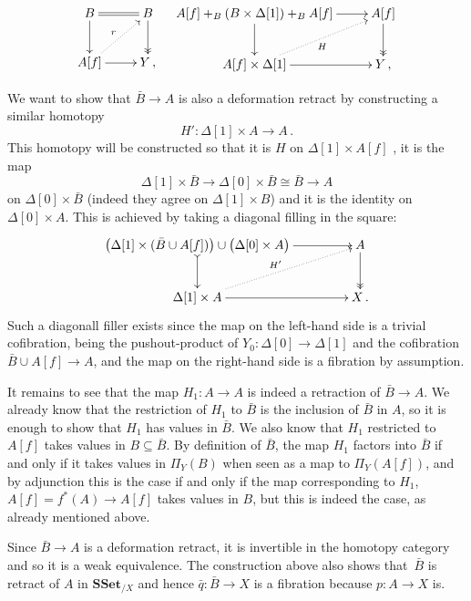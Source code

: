 \documentclass[reqno,10pt,a4paper,oneside,draft]{amsart}
\makeatletter
\renewenvironment{proof}[1][\proofname] {\par\pushQED{\qed}\normalfont\topsep6\p@\@plus6\p@\relax\trivlist\item[\hskip\labelsep\bf#1\@addpunct{.}]\ignorespaces}{\popQED\endtrivlist\@endpefalse}
\numberwithin{equation}{section}
\theoremstyle{mythm}
\theoremstyle{mydef}
\theoremstyle{myrmk}
\newcommand{\co}{\colon}
\newcommand{\iso}{\cong}
\newcommand{\SSet}{\mathbf{SSet}}
\makeatother
\begin{document}
\begin{proof}
\[\xymatrix{
B \ar[d] \ar@{=}[r]  & B \ar@{->>}[d] \\
A[f] \ar[r] \ar@{.>}[ur]^r  & Y \, , 
} \quad \xymatrix{
\displaystyle A[f] +_B \left( B \times \Delta[1] \right) +_B A[f] \ar[d] \ar[r]  & A[f] \ar@{->>}[d] \\
A[f] \times \Delta[1] \ar[r] \ar@{.>}[ur]_H  & Y \, , 
}\]

We want to show that $\bar{B} \rightarrow A$ is also a deformation retract by constructing a similar homotopy 
\[
H' \co \Delta[1] \times A \rightarrow A \, .
\] 
This homotopy will be constructed so that it is $H$ on $\Delta[1] \times A[f]$ ,  it is the map 
\[
\Delta[1] \times \bar{B} \rightarrow \Delta[0]  \times \bar{B} \iso \bar{B} \rightarrow A
\] 
on $\Delta[0] \times \bar{B} $ (indeed they agree on $\Delta[1] \times B$) and it is the identity on $\Delta[0] \times A$.  This is achieved by taking a diagonal filling in the square:
\[
\xymatrix@C=1.5cm{
\big( \Delta[1] \times (\bar{B} \cup A[f]) \big)  \cup \big( \Delta[0] \times A \big) \ar@{>->}[d] \ar[r] & A \ar@{->>}[d] \\
\Delta[1] \times A \ar[r] \ar@{.>}[ur]^{H'} & X \, .
}\]
Such a diagonall filler exists since the map on the left-hand side is a trivial cofibration, being the 
 pushout-product of $Y_0 \co \Delta[0] \rightarrow \Delta[1]$ and the cofibration $\bar{B} \cup A[f] \rightarrow A$, and the map on the right-hand side is a fibration by assumption.

It remains to see that the map $H_{1} \co A \rightarrow A$ is indeed a retraction of $\bar{B} \rightarrow A$. We already know that the restriction of $H_{1}$ to $\bar{B}$ is  the inclusion of $\bar{B}$ in $A$, so it is enough to show that $H_{1}$ has values in $\bar{B}$. We also know that $H_{1}$ restricted to $A[f]$ takes values in $B \subseteq \bar{B}$. By definition of $\bar{B}$, the map $H_1$ factors into $\bar{B}$ if and only if it takes values in $\Pi_Y(B)$ when seen as a map to $\Pi_Y(A[f])$, and by adjunction this is the case if and only if the map corresponding to $H_1$, $A[f]= f^*(A) \rightarrow A[f]$ takes values in $B$, but this is indeed the case, as already mentioned above.

Since $\bar{B} \rightarrow A$ is a deformation retract, it is invertible in the homotopy category and so it is a weak equivalence. The construction above also shows that~$\bar{B}$ is retract of $A$ in $\SSet_{/X}$ and hence $\bar{q} \co \bar{B} \rightarrow X$ is a fibration because $p \co A \rightarrow X$ is.
\end{proof}
\end{document}
